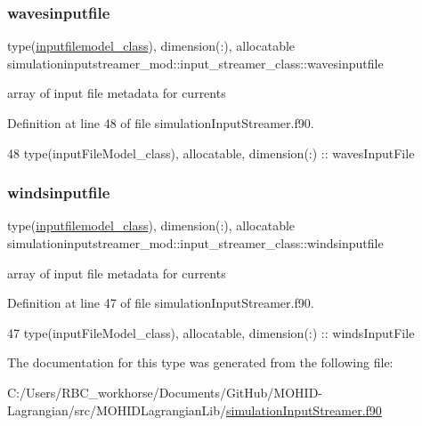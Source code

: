 \subsubsection{\texorpdfstring{wavesinputfile}{wavesinputfile}}
{\footnotesize\ttfamily type(\mbox{\hyperlink{structsimulationinputstreamer__mod_1_1inputfilemodel__class}{inputfilemodel\+\_\+class}}), dimension(\+:), allocatable simulationinputstreamer\+\_\+mod\+::input\+\_\+streamer\+\_\+class\+::wavesinputfile\hspace{0.3cm}{\ttfamily [private]}}



array of input file metadata for currents 



Definition at line 48 of file simulation\+Input\+Streamer.\+f90.


\begin{DoxyCode}
48         \textcolor{keywordtype}{type}(inputFileModel\_class), \textcolor{keywordtype}{allocatable}, \textcolor{keywordtype}{dimension(:)} :: wavesInputFile
\end{DoxyCode}
\mbox{\label{structsimulationinputstreamer__mod_1_1input__streamer__class_aff314be52a74d7bfb4db1e3b56c8b539}} 
\subsubsection{\texorpdfstring{windsinputfile}{windsinputfile}}
{\footnotesize\ttfamily type(\mbox{\hyperlink{structsimulationinputstreamer__mod_1_1inputfilemodel__class}{inputfilemodel\+\_\+class}}), dimension(\+:), allocatable simulationinputstreamer\+\_\+mod\+::input\+\_\+streamer\+\_\+class\+::windsinputfile\hspace{0.3cm}{\ttfamily [private]}}



array of input file metadata for currents 



Definition at line 47 of file simulation\+Input\+Streamer.\+f90.


\begin{DoxyCode}
47         \textcolor{keywordtype}{type}(inputFileModel\_class), \textcolor{keywordtype}{allocatable}, \textcolor{keywordtype}{dimension(:)} :: windsInputFile
\end{DoxyCode}


The documentation for this type was generated from the following file\+:\begin{DoxyCompactItemize}
\item 
C\+:/\+Users/\+R\+B\+C\+\_\+workhorse/\+Documents/\+Git\+Hub/\+M\+O\+H\+I\+D-\/\+Lagrangian/src/\+M\+O\+H\+I\+D\+Lagrangian\+Lib/\mbox{\hyperlink{simulation_input_streamer_8f90}{simulation\+Input\+Streamer.\+f90}}\end{DoxyCompactItemize}
